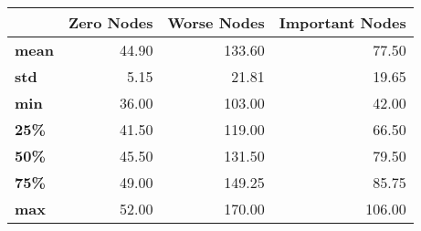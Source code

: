 \begin{tabular}{lrrr}
\toprule
{} &  Zero Nodes &  Worse Nodes &  Important Nodes \\
\midrule
\textbf{mean} &       44.90 &       133.60 &            77.50 \\
\textbf{std } &        5.15 &        21.81 &            19.65 \\
\textbf{min } &       36.00 &       103.00 &            42.00 \\
\textbf{25\% } &       41.50 &       119.00 &            66.50 \\
\textbf{50\% } &       45.50 &       131.50 &            79.50 \\
\textbf{75\% } &       49.00 &       149.25 &            85.75 \\
\textbf{max } &       52.00 &       170.00 &           106.00 \\
\bottomrule
\end{tabular}
